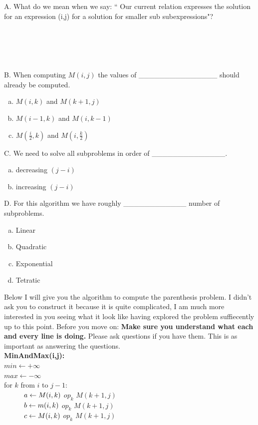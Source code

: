 \documentclass[12pt]{article}
\newcommand\tab[1][1cm]{\hspace*{#1}}
\begin{document}
A. What do we mean when we say: `` Our current relation expresses 
the solution for an expression (i,j) for a solution for smaller 
sub subexpressions"?\\\\\\\\\\\\
B. When computing $M(i,j)$ the values of _______________ 
should already be computed.
\begin{enumerate}[a)]
    \item $M(i,k)$ and $M(k+1,j)$
    \item $M(i-1,k)$ and  $M(i,k-1)$
    \item $M(\frac{i}{2},k)$ and  $M(i,\frac{k}{2})$
\end{enumerate}
C. We need to solve all subproblems in order of ______________.
\begin{enumerate}[a)]
    \item decreasing $(j-i)$
    \item increasing $(j-i)$
\end{enumerate}
\newpage
\noindent D. For this algorithm we have roughly ____________ number of subproblems. 
\begin{enumerate}[a)]
    \item Linear
    \item Quadratic
    \item Exponential
    \item Tetratic
\end{enumerate}
Below I will give you the algorithm to compute the parenthesis problem.
I didn't ask you to construct it because it is quite complicated, I am 
much more interested in you seeing what it look like having explored the problem
suffiecently up to this point. Before you move on: \textbf{Make sure you
understand what each and every line is doing.} Please ask questions if you
have them. This is as important as answering the questions.\\
\noindent \textbf{MinAndMax(i,j):}\\
$min \leftarrow +\infty$\\
$max \leftarrow -\infty$\\
for $k$ from $i$ to $j-1$:\\
$\tab a \leftarrow M(i,k)$ $op_k$ $M(k+1,j)$\\
$\tab b \leftarrow m(i,k)$ $op_k$ $M(k+1,j)$\\
$\tab c \leftarrow M(i,k)$ $op_k$ $M(k+1,j)$\\
\end{document}
